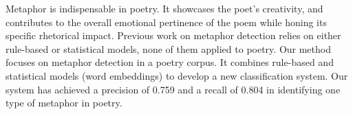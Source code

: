 Metaphor is indispensable in poetry. It showcases the poet's creativity, and contributes to the overall emotional pertinence of the poem while honing its specific rhetorical impact. Previous work on metaphor detection relies on either rule-based or statistical models, none of them applied to poetry. Our method focuses on metaphor detection in a poetry corpus. It combines rule-based and statistical models (word embeddings) to develop a new classification system. Our system has achieved a precision of 0.759 and a recall of 0.804 in identifying one type of metaphor in poetry.
